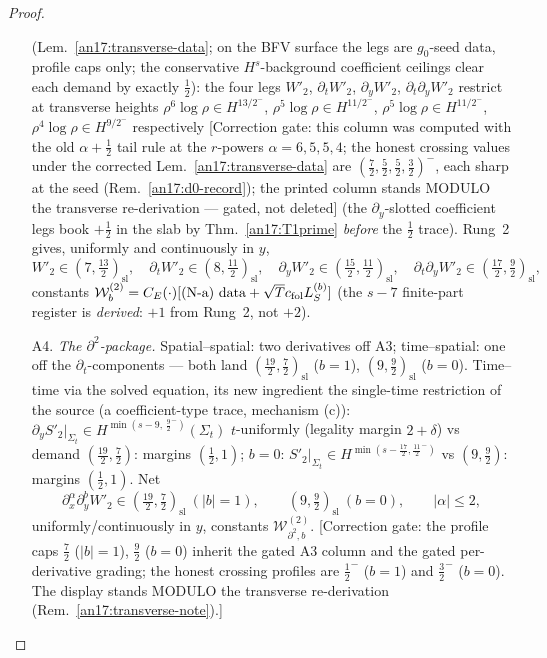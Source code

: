 \begin{proof}
\begin{itemize}
  (Lem.~\ref{an17:transverse-data}; on the BFV surface the legs are $g_0$-seed
  data, profile caps only; the conservative $H^s$-background coefficient
  ceilings clear each demand by exactly $\tfrac12$): the four legs $W'_2$,
  $\partial_t W'_2$, $\partial_y W'_2$, $\partial_t\partial_y W'_2$ restrict at
  transverse heights $\rho^6\log\rho\in H^{13/2^-}$, $\rho^5\log\rho\in
  H^{11/2^-}$, $\rho^5\log\rho\in H^{11/2^-}$, $\rho^4\log\rho\in H^{9/2^-}$
  respectively \textup{[Correction gate: this column was computed with the old
  $\alpha+\tfrac12$ tail rule at the $r$-powers $\alpha=6,5,5,4$; the honest
  crossing values under the corrected Lem.~\ref{an17:transverse-data} are
  $(\tfrac72,\tfrac52,\tfrac52,\tfrac32)^-$, each sharp at the seed
  (Rem.~\ref{an17:d0-record}); the printed column stands MODULO the
  transverse re-derivation --- gated, not deleted]} (the $\partial_y$-slotted
  coefficient legs book $+\tfrac12$ in
  the slab by Thm.~\ref{an17:T1prime} \emph{before} the $\tfrac12$ trace). Rung~2
  gives, uniformly and continuously in $y$,
  \[
   W'_2\in(7,\tfrac{13}2)_{\mathrm{sl}},\quad
   \partial_t W'_2\in(8,\tfrac{11}2)_{\mathrm{sl}},\quad
   \partial_y W'_2\in(\tfrac{15}2,\tfrac{11}2)_{\mathrm{sl}},\quad
   \partial_t\partial_y W'_2\in(\tfrac{17}2,\tfrac92)_{\mathrm{sl}},
  \]
  constants $\mathcal W^{(2)}_b=C_E(\cdot)[\textup{(N-a) data}+\sqrt T
  c_{\mathrm{fol}}L^{(b)}_S]$ (the $s-7$ finite-part register is \emph{derived}:
  $+1$ from Rung~2, not $+2$).
\item[A4.] \emph{The $\partial^2$-package.} Spatial--spatial: two derivatives
  off A3; time--spatial: one off the $\partial_t$-components --- both land
  $(\tfrac{19}2,\tfrac72)_{\mathrm{sl}}$ ($b{=}1$),
  $(9,\tfrac92)_{\mathrm{sl}}$ ($b{=}0$). Time--time via the solved equation,
  its new ingredient the single-time restriction of the source (a
  coefficient-type trace, mechanism (c)): $\partial_yS'_2|_{\Sigma_t}\in
  H^{\min(s-9,\,\frac92^-)}(\Sigma_t)$ $t$-uniformly (legality margin
  $2+\delta$) vs demand $(\tfrac{19}2,\tfrac72)$: margins $(\tfrac12,1)$; $b=0$:
  $S'_2|_{\Sigma_t}\in H^{\min(s-\frac{17}2,\frac{11}2^-)}$ vs $(9,\tfrac92)$:
  margins $(\tfrac12,1)$. Net
  \begin{equation}\label{an17:eq-slice-A4}
   \partial_x^\alpha\partial_y^bW'_2\in(\tfrac{19}2,\tfrac72)_{\mathrm{sl}}\
   (|b|{=}1),\qquad(9,\tfrac92)_{\mathrm{sl}}\ (b{=}0),\qquad|\alpha|\le2,
  \end{equation}
  uniformly/continuously in $y$, constants $\mathcal W^{(2)}_{\partial^2,b}$.
  \textup{[Correction gate: the profile caps $\tfrac72$ ($|b|{=}1$), $\tfrac92$
  ($b{=}0$) inherit the gated A3 column and the gated per-derivative grading;
  the honest crossing profiles are $\tfrac12^-$ ($b{=}1$) and $\tfrac32^-$
  ($b{=}0$). The display stands MODULO the transverse re-derivation
  (Rem.~\ref{an17:transverse-note}).]}
\end{itemize}


\end{proof}
